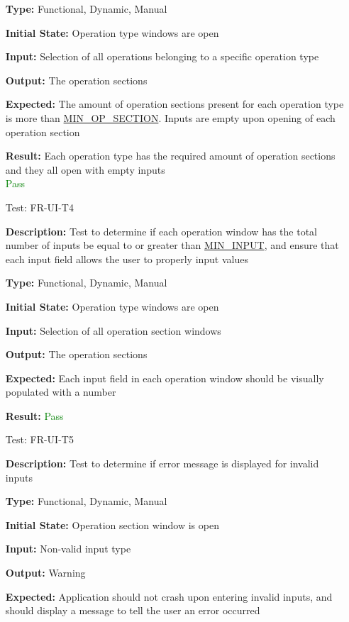 \documentclass[12pt, titlepage]{article}
\begin{document}
\begin{enumerate}
\textbf{Type:} Functional, Dynamic, Manual
					
\textbf{Initial State:} Operation type windows are open
					
\textbf{Input:} Selection of all operations belonging to a specific operation type
					
\textbf{Output:} The operation sections

\textbf{Expected:} The amount of operation sections present for each operation type is more than \hyperref[sec:sp]{MIN\_OP\_SECTION}. Inputs are empty upon opening of each operation section

\textbf{Result:} Each operation type has the required amount of operation sections and they all open with empty inputs\\ \textcolor{Green}{Pass}

\item[Test:]{FR-UI-T4\\}

\textbf{Description:} Test to determine if each operation window has the total number of inputs be equal to or greater than \hyperref[sec:sp]{MIN\_INPUT}, and ensure that each input field allows the user to properly input values

\textbf{Type:} Functional, Dynamic, Manual
					
\textbf{Initial State:} Operation type windows are open
					
\textbf{Input:} Selection of all operation section windows
					
\textbf{Output:} The operation sections

\textbf{Expected:} Each input field in each operation window should be visually populated with a number

\textbf{Result:} \textcolor{Green}{Pass}

\item[Test:]{FR-UI-T5\\}

\textbf{Description:} Test to determine if error message is displayed for invalid inputs

\textbf{Type:} Functional, Dynamic, Manual
					
\textbf{Initial State:} Operation section window is open 
					
\textbf{Input:} Non-valid input type
					
\textbf{Output:} Warning

\textbf{Expected:} Application should not crash upon entering invalid inputs, and should display a message to tell the user an error occurred


\end{enumerate}
\end{document}
